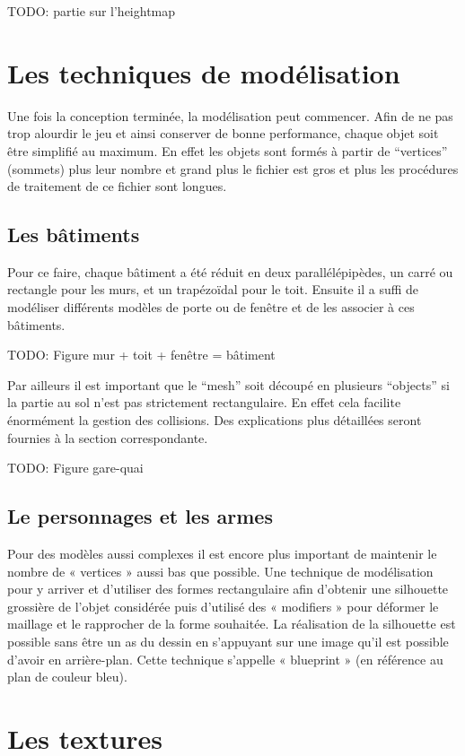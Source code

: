 \documentclass[11pt]{report}
\begin{document}
TODO: partie sur l'heightmap

\section{Les techniques de modélisation}

Une fois la conception terminée, la modélisation peut commencer. Afin de ne pas trop alourdir le jeu et ainsi conserver de bonne performance, chaque objet soit être simplifié au maximum. En effet les objets sont formés à partir de ``vertices'' (sommets) plus leur nombre et grand plus le fichier est gros et plus les procédures de traitement de ce fichier sont longues.

\subsection{Les bâtiments}

Pour ce faire, chaque bâtiment a été réduit en deux parallélépipèdes, un carré ou rectangle pour les murs, et un trapézoïdal pour le toit. Ensuite il a suffi de modéliser différents modèles de porte ou de fenêtre et de les associer à ces bâtiments.

TODO: Figure mur + toit + fenêtre = bâtiment

Par ailleurs il est important que le ``mesh'' soit découpé en plusieurs ``objects''  si la partie au sol n’est pas strictement rectangulaire. En effet cela facilite énormément la gestion des collisions. Des explications plus détaillées seront fournies à la section correspondante.

TODO: Figure gare-quai

\subsection{Le personnages et les armes}

Pour des modèles aussi complexes il est encore plus important de maintenir le nombre de « vertices » aussi bas que possible. Une technique de modélisation pour y arriver et d’utiliser des formes rectangulaire afin d’obtenir une silhouette grossière de l’objet considérée puis d’utilisé des « modifiers » pour déformer le maillage et le rapprocher de la forme souhaitée. La réalisation de la silhouette est possible sans être un as du dessin en s’appuyant sur une image qu’il est possible d’avoir en arrière-plan. Cette technique s’appelle « blueprint » (en référence au plan de couleur bleu).

\section{Les textures}
\end{document}
